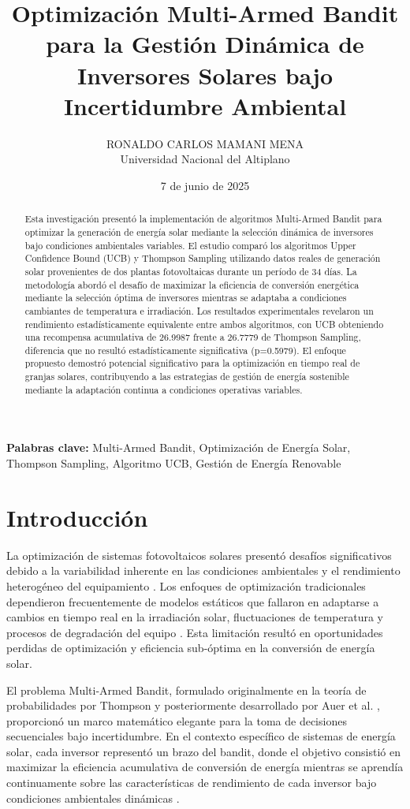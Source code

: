 \documentclass[12pt,a4paper]{article}
\title{Optimización Multi-Armed Bandit para la Gestión Dinámica de Inversores Solares bajo Incertidumbre Ambiental}
\author{RONALDO CARLOS MAMANI MENA\\Universidad Nacional del Altiplano}
\date{7 de junio de 2025}
\begin{document}
\maketitle

\begin{abstract}
\justify
Esta investigación presentó la implementación de algoritmos Multi-Armed Bandit para optimizar la generación de energía solar mediante la selección dinámica de inversores bajo condiciones ambientales variables. El estudio comparó los algoritmos Upper Confidence Bound (UCB) y Thompson Sampling utilizando datos reales de generación solar provenientes de dos plantas fotovoltaicas durante un período de 34 días. La metodología abordó el desafío de maximizar la eficiencia de conversión energética mediante la selección óptima de inversores mientras se adaptaba a condiciones cambiantes de temperatura e irradiación. Los resultados experimentales revelaron un rendimiento estadísticamente equivalente entre ambos algoritmos, con UCB obteniendo una recompensa acumulativa de 26.9987 frente a 26.7779 de Thompson Sampling, diferencia que no resultó estadísticamente significativa (p=0.5979). El enfoque propuesto demostró potencial significativo para la optimización en tiempo real de granjas solares, contribuyendo a las estrategias de gestión de energía sostenible mediante la adaptación continua a condiciones operativas variables.
\end{abstract}

\textbf{Palabras clave:} Multi-Armed Bandit, Optimización de Energía Solar, Thompson Sampling, Algoritmo UCB, Gestión de Energía Renovable

\section{Introducción}

\justify
La optimización de sistemas fotovoltaicos solares presentó desafíos significativos debido a la variabilidad inherente en las condiciones ambientales y el rendimiento heterogéneo del equipamiento \cite{mahmoud2021}. Los enfoques de optimización tradicionales dependieron frecuentemente de modelos estáticos que fallaron en adaptarse a cambios en tiempo real en la irradiación solar, fluctuaciones de temperatura y procesos de degradación del equipo \cite{rezk2020}. Esta limitación resultó en oportunidades perdidas de optimización y eficiencia sub-óptima en la conversión de energía solar.

El problema Multi-Armed Bandit, formulado originalmente en la teoría de probabilidades por Thompson \cite{thompson1933} y posteriormente desarrollado por Auer et al. \cite{auer2002}, proporcionó un marco matemático elegante para la toma de decisiones secuenciales bajo incertidumbre. En el contexto específico de sistemas de energía solar, cada inversor representó un brazo del bandit, donde el objetivo consistió en maximizar la eficiencia acumulativa de conversión de energía mientras se aprendía continuamente sobre las características de rendimiento de cada inversor bajo condiciones ambientales dinámicas \cite{li2021}.
\end{document}
